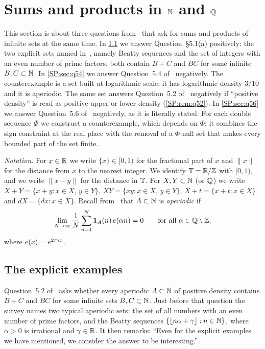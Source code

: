 \section{Sums and products in \texorpdfstring{$\mathbb{N}$}{N} and \texorpdfstring{$\mathbb{Q}$}{Q}}
\label{SP:sec}

This section is about three questions from~\cite[\S5.1]{kra2023problems} that ask for sums and
products of infinite sets at the same time.
In \cref{SP:sec:u51a} we answer Question~\S5.1(a) positively: the two explicit sets named
in~\cite[\S5.1]{kra2023problems}, namely Beatty sequences and the set of integers with an even
number of prime factors, both contain $B+C$ and $BC$ for some infinite $B,C\subset\mathbb{N}$.
In \cref{SP:sec:q54} we answer Question~5.4 of~\cite{kra2023problems} negatively. The counterexample
is a set built at logarithmic scale; it has logarithmic density $3/10$ and it is aperiodic.
The same set answers Question~5.2 of~\cite{kra2023problems} negatively if ``positive density''
is read as positive upper or lower density (\cref{SP:rem:q52}).
In \cref{SP:sec:q56} we answer Question~5.6 of~\cite{kra2023problems} negatively, as it is literally
stated. For each double \Fol{} sequence $\Phi$ we construct a counterexample, which depends on
$\Phi$: it combines the sign constraint at the real place with the removal of a $\Phi$-null set
that makes every bounded part of the set finite.

\smallskip
\noindent\emph{Notation.}
For $x\in\mathbb{R}$ we write $\{x\}\in[0,1)$ for the fractional part of $x$ and $\|x\|$ for the distance
from $x$ to the nearest integer.
We identify $\mathbb{T}=\mathbb{R}/\mathbb{Z}$ with $[0,1)$, and we write $\|x-y\|$ for the distance in $\mathbb{T}$.
For $X,Y\subset\mathbb{N}$ (or $\mathbb{Q}$) we write $X+Y=\{x+y:x\in X,\,y\in Y\}$, $XY=\{xy:x\in X,\,y\in Y\}$,
$X+t=\{x+t:x\in X\}$ and $dX=\{dx:x\in X\}$.
Recall from~\cite[eq.~(19)]{kra2023problems} that $A\subset\mathbb{N}$ is \emph{aperiodic} if
\begin{equation}\label{SP:eq:aperiodic}
\lim_{N\to\infty}\frac1N\sum_{n=1}^N\mathbf{1}_A(n)\,e(\alpha n)=0\qquad\text{for all }\alpha\in\mathbb{Q}\setminus\mathbb{Z},
\end{equation}
where $e(x)=e^{2\pi i x}$.

\subsection{The explicit examples}
\label{SP:sec:u51a}

Question~5.2 of~\cite{kra2023problems} asks whether every aperiodic $A\subset\mathbb{N}$ of positive
density contains $B+C$ and $BC$ for some infinite sets $B,C\subset\mathbb{N}$. Just before that question
the survey names two typical aperiodic sets: the set of all numbers with an even number of prime
factors, and the Beatty sequences $\{\lfloor n\alpha+\gamma\rfloor:n\in\mathbb{N}\}$, where $\alpha>0$ is
irrational and $\gamma\in\mathbb{R}$. It then remarks: ``Even for the explicit examples we have mentioned,
we consider the answer to be interesting.''

